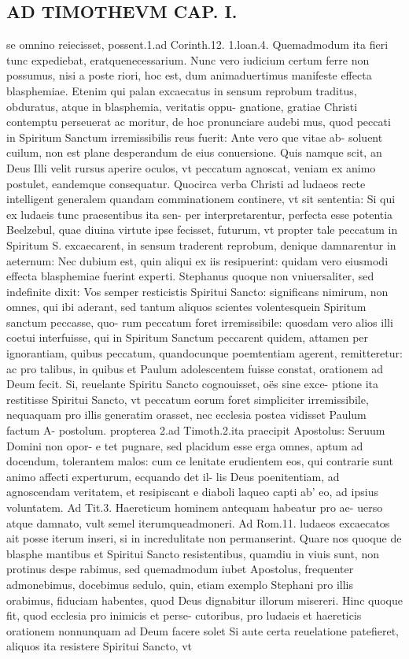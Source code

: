 \documentclass{article}
\begin{document}
\begin{pages}
\section*{AD TIMOTHEVM CAP. I. }
\marginpar{[ p.40 ]}\pstart se omnino reiecisset, possent.1.ad Corinth.12. 1.loan.4. Quemadmodum ita fieri tunc expediebat, eratquenecessarium. Nunc vero iudicium certum ferre non possumus, nisi a poste riori, hoc est, dum animaduertimus manifeste effecta blasphemiae. Etenim qui palan excaecatus in sensum reprobum traditus, obduratus, atque  in blasphemia, veritatis oppu- gnatione, gratiae Christi contemptu perseuerat ac moritur, de hoc pronunciare audebi mus, quod peccati in Spiritum Sanctum irremissibilis reus fuerit: Ante vero que  vitae ab- soluent cuilum, non est plane desperandum de eius conuersione. Quis namque  scit, an Deus Illi velit rursus aperire oculos, vt peccatum agnoscat, veniam ex animo postulet, eandemque  consequatur. Quocirca verba Christi ad ludaeos recte intelligent generalem quandam comminationem continere, vt sit sententia: Si qui ex ludaeis tunc praesentibus ita sen- per interpretarentur, perfecta esse potentia Beelzebul, quae diuina virtute ipse fecisset, futurum, vt propter tale peccatum in Spiritum S. excaecarent, in sensum traderent reprobum, denique  damnarentur in aeternum: Nec dubium est, quin aliqui ex iis resipuerint: quidam vero eiusmodi effecta blasphemiae fuerint experti. Stephanus quoque  non vniuersaliter, sed indefinite dixit: Vos semper resticistis Spiritui Sancto: significans nimirum, non omnes, qui ibi aderant, sed tantum aliquos scientes volentesquein Spiritum sanctum peccasse, quo- rum peccatum foret irremissibile: quosdam vero alios illi coetui interfuisse, qui in Spiritum Sanctum peccarent quidem, attamen per ignorantiam, quibus peccatum, quandocunque  poemtentiam agerent, remitteretur: ac pro talibus, in quibus et Paulum adolescentem fuisse constat, orationem ad Deum fecit. Si, reuelante Spiritu Sancto cognouisset, oës sine exce- ptione ita restitisse Spiritui Sancto, vt peccatum eorum foret simpliciter irremissibile, nequaquam pro illis generatim orasset, nec ecclesia postea vidisset Paulum factum A- postolum. propterea 2.ad Timoth.2.ita praecipit Apostolus: Seruum Domini non opor- e tet pugnare, sed placidum esse erga omnes, aptum ad docendum, tolerantem malos: cum ce lenitate erudientem eos, qui contrarie sunt animo affecti experturum, ecquando det il-  lis Deus poenitentiam, ad agnoscendam veritatem, et resipiscant e diaboli laqueo capti ab' eo, ad ipsius voluntatem. Ad Tit.3. Haereticum hominem antequam habeatur pro ae- uerso atque  damnato, vult semel iterumqueadmoneri. Ad Rom.11. ludaeos excaecatos ait posse iterum inseri, si in incredulitate non permanserint. Quare nos quoque  de blasphe mantibus et Spiritui Sancto resistentibus, quamdiu in viuis sunt, non protinus despe rabimus, sed quemadmodum iubet Apostolus, frequenter admonebimus, docebimus sedulo, quin, etiam exemplo Stephani pro illis orabimus, fiduciam habentes, quod Deus dignabitur illorum misereri. Hinc quoque  fit, quod ecclesia pro inimicis et perse- cutoribus, pro ludaeis et haereticis orationem nonnunquam ad Deum facere solet Si aute certa reuelatione patefieret, aliquos ita resistere Spiritui Sancto, vt 
\end{pages}
\end{document}
